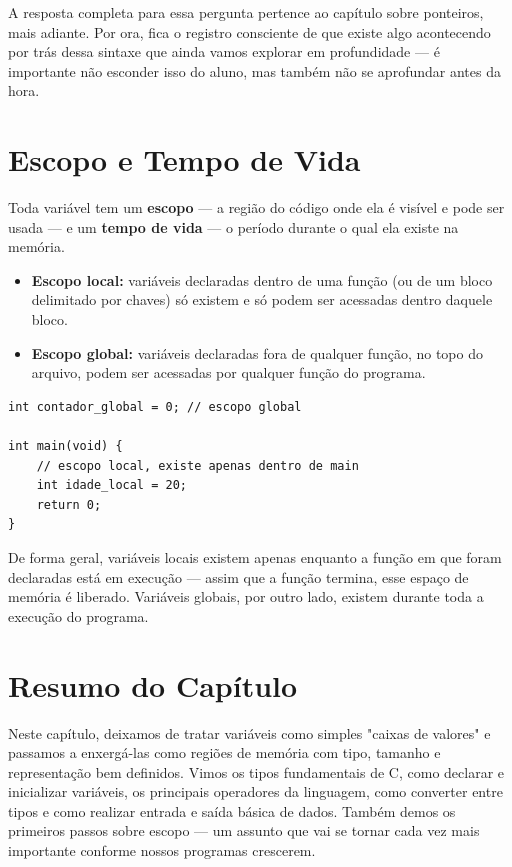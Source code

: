 \documentclass[12pt,a4paper,oneside]{extreport}
\begin{document}
A resposta completa para essa pergunta pertence ao capítulo sobre ponteiros, mais adiante. Por ora, fica o registro consciente de que existe algo acontecendo por trás dessa sintaxe que ainda vamos explorar em profundidade — é importante não esconder isso do aluno, mas também não se aprofundar antes da hora.

\section{Escopo e Tempo de Vida}
Toda variável tem um \textbf{escopo} — a região do código onde ela é visível e pode ser usada — e um \textbf{tempo de vida} — o período durante o qual ela existe na memória.

\begin{itemize}
    \item \textbf{Escopo local:} variáveis declaradas dentro de uma função (ou de um bloco delimitado por chaves) só existem e só podem ser acessadas dentro daquele bloco.
    \item \textbf{Escopo global:} variáveis declaradas fora de qualquer função, no topo do arquivo, podem ser acessadas por qualquer função do programa.
\end{itemize}

\begin{lstlisting}
int contador_global = 0; // escopo global

int main(void) {
    // escopo local, existe apenas dentro de main
    int idade_local = 20; 
    return 0;
}
\end{lstlisting}

De forma geral, variáveis locais existem apenas enquanto a função em que foram declaradas está em execução — assim que a função termina, esse espaço de memória é liberado. Variáveis globais, por outro lado, existem durante toda a execução do programa.


\section*{Resumo do Capítulo}
Neste capítulo, deixamos de tratar variáveis como simples "caixas de valores" e passamos a enxergá-las como regiões de memória com tipo, tamanho e representação bem definidos. Vimos os tipos fundamentais de C, como declarar e inicializar variáveis, os principais operadores da linguagem, como converter entre tipos e como realizar entrada e saída básica de dados. Também demos os primeiros passos sobre escopo — um assunto que vai se tornar cada vez mais importante conforme nossos programas crescerem.
\end{document}
